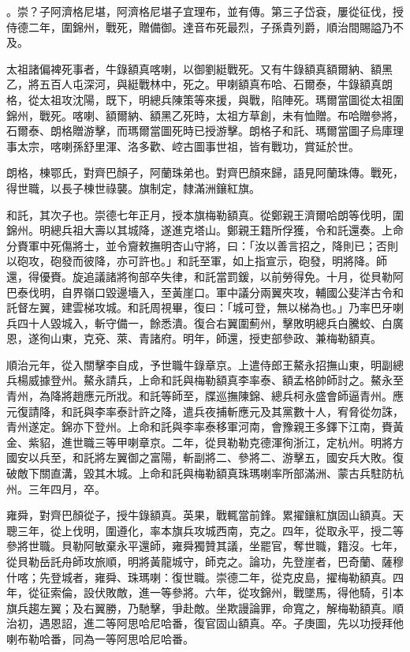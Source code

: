 \begin{pinyinscope}
。崇？子阿濟格尼堪，阿濟格尼堪子宜理布，並有傳。第三子岱袞，屢從征伐，授侍德二年，圍錦州，戰死，贈備御。達音布死最烈，子孫貴列爵，順治間賜謚乃不及。

太祖諸偏裨死事者，牛錄額真喀喇，以御劉綎戰死。又有牛錄額真額爾納、額黑乙，將五百人屯深河，與綎戰林中，死之。甲喇額真布哈、石爾泰，牛錄額真朗格，從太祖攻沈陽，既下，明總兵陳策等來援，與戰，陷陣死。瑪爾當圖從太祖圍錦州，戰死。喀喇、額爾納、額黑乙死時，太祖方草創，未有恤贈。布哈贈參將，石爾泰、朗格贈游擊，而瑪爾當圖死時已授游擊。朗格子和託、瑪爾當圖子烏庫理事太宗，喀喇孫舒里渾、洛多歡、崆古圖事世祖，皆有戰功，賞延於世。

朗格，棟鄂氏，對齊巴顏子，阿蘭珠弟也。對齊巴顏來歸，語見阿蘭珠傳。戰死，得世職，以長子棟世祿襲。旗制定，隸滿洲鑲紅旗。

和託，其次子也。崇德七年正月，授本旗梅勒額真。從鄭親王濟爾哈朗等伐明，圍錦州。明總兵祖大壽以其城降，遂進克塔山。鄭親王籍所俘獲，令和託還奏。上命分賚軍中死傷將士，並令齎敕撫明杏山守將，曰：「汝以善言招之，降則已；否則以砲攻，砲發而彼降，亦可許也。」和託至軍，如上指宣示，砲發，明將降。師還，得優賚。旋追議諸將徇部卒失律，和託當罰鍰，以前勞得免。十月，從貝勒阿巴泰伐明，自界嶺口毀邊墻入，至黃崖口。軍中議分兩翼夾攻，輔國公斐洋古令和託督左翼，建雲梯攻城。和託周視畢，復曰：「城可登，無以梯為也。」乃率巴牙喇兵四十人毀城入，斬守備一，餘悉潰。復合右翼圍薊州，擊敗明總兵白騰蛟、白廣恩，遂徇山東，克兗、萊、青諸府。明年，師還，授吏部參政、兼梅勒額真。

順治元年，從入關擊李自成，予世職牛錄章京。上遣侍郎王鰲永招撫山東，明副總兵楊威據登州。鰲永請兵，上命和託與梅勒額真李率泰、額孟格帥師討之。鰲永至青州，為降將趙應元所戕。和託等師至，牒巡撫陳錦、總兵柯永盛會師逼青州。應元復請降，和託與李率泰計許之降，遣兵夜捕斬應元及其黨數十人，宥脅從勿誅，青州遂定。錦亦下登州。上命和託與李率泰移軍河南，會豫親王多鐸下江南，賚黃金、紫貂，進世職三等甲喇章京。二年，從貝勒勒克德渾徇浙江，定杭州。明將方國安以兵至，和託將左翼御之富陽，斬副將二、參將二、游擊五，國安兵大敗。復破敵下關直溝，毀其木城。上命和託與梅勒額真珠瑪喇率所部滿洲、蒙古兵駐防杭州。三年四月，卒。

雍舜，對齊巴顏從子，授牛錄額真。英果，戰輒當前鋒。累擢鑲紅旗固山額真。天聰三年，從上伐明，圍遵化，率本旗兵攻城西南，克之。四年，從取永平，授二等參將世職。貝勒阿敏棄永平還師，雍舜獨贊其議，坐罷官，奪世職，籍沒。七年，從貝勒岳託舟師攻旅順，明將黃龍城守，師克之。論功，先登崖者，巴奇蘭、薩穆什喀；先登城者，雍舜、珠瑪喇：復世職。崇德二年，從克皮島，擢梅勒額真。四年，從征索倫，設伏敗敵，進一等參將。六年，從攻錦州，戰墜馬，得他騎，引本旗兵趨左翼；及右翼勝，乃馳擊，爭赴敵。坐欺謾論罪，命寬之，解梅勒額真。順治初，遇恩詔，進二等阿思哈尼哈番，復官固山額真。卒。子庚圖，先以功授拜他喇布勒哈番，同為一等阿思哈尼哈番。


\end{pinyinscope}
